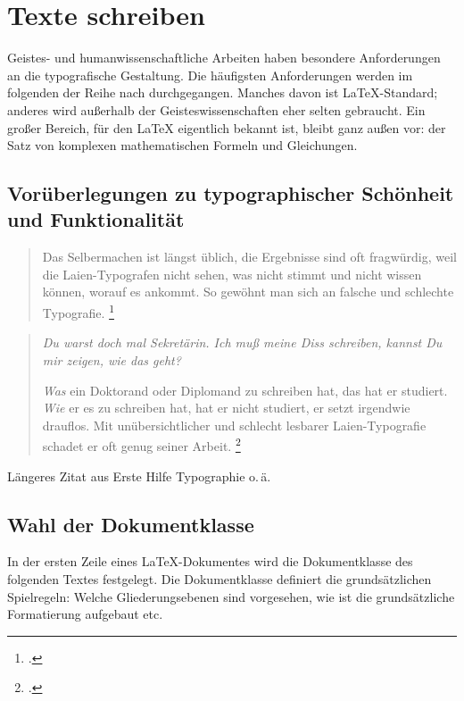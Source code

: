 \chapter{Texte schreiben}

Geistes- und humanwissenschaftliche Arbeiten haben besondere Anforderungen an die typografische
Gestaltung. 
Die häufigsten Anforderungen werden im folgenden der Reihe nach durchgegangen.
Manches davon ist \LaTeX-Standard; anderes wird außerhalb der Geisteswissenschaften eher
selten gebraucht.
Ein großer Bereich, für den \LaTeX{} eigentlich bekannt ist, bleibt ganz außen vor:
der Satz von komplexen mathematischen Formeln und Gleichungen.


\section{Vorüberlegungen zu typographischer Schönheit und Funktionalität}


\begin{quote}
 Das Selbermachen ist längst üblich, die Ergebnisse sind oft fragwürdig,
 weil die Laien-Typografen nicht sehen, was nicht stimmt und nicht wissen
 können, worauf es ankommt.
 So gewöhnt man sich an falsche und schlechte Typografie.
 \footcite[9]{erste_hilfe}
 \end{quote}
 
\begin{quotation}
 \emph{Du warst doch mal Sekretärin.
 Ich muß meine Diss schreiben, kannst Du mir zeigen, wie das geht?}
 
 \emph{Was} ein Doktorand oder Diplomand zu schreiben hat, das hat er studiert.
 \emph{Wie} er es zu schreiben hat, hat er nicht studiert, er setzt irgendwie drauflos.
 Mit unübersichtlicher und schlecht lesbarer Laien-Typografie schadet er oft genug seiner Arbeit.
 \footcite[86]{erste_hilfe}
\end{quotation}


Längeres Zitat aus Erste Hilfe Typographie o.\,ä.


\section{Wahl der Dokumentklasse}

In der ersten Zeile eines \LaTeX -Dokumentes wird die Dokumentklasse des folgenden Textes 
festgelegt. Die Dokumentklasse definiert die grundsätzlichen Spielregeln:
Welche Gliederungsebenen sind vorgesehen, wie ist die grundsätzliche Formatierung aufgebaut etc.

